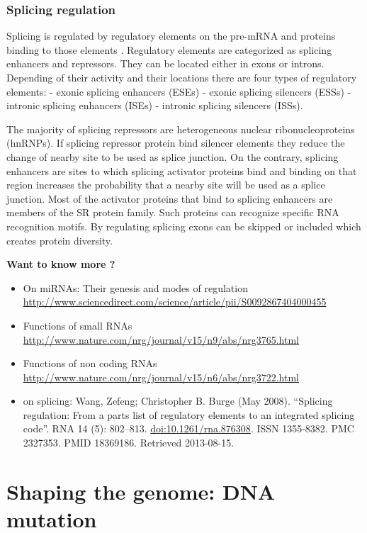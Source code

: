 \documentclass[12pt,]{krantz}
\theoremstyle{definition}
\theoremstyle{definition}
\theoremstyle{definition}
\theoremstyle{remark}
\let\BeginKnitrBlock\begin \let\EndKnitrBlock\end
\begin{document}
\hypertarget{splicing-regulation}{%
\subsubsection{Splicing regulation}\label{splicing-regulation}}

Splicing is regulated by regulatory elements on the pre-mRNA and
proteins binding to those elements . Regulatory elements are categorized
as splicing enhancers and repressors. They can be located either in
exons or introns. Depending of their activity and their locations there
are four types of regulatory elements: - exonic splicing enhancers
(ESEs) - exonic splicing silencers (ESSs) - intronic splicing enhancers
(ISEs) - intronic splicing silencers (ISSs).

The majority of splicing repressors are heterogeneous nuclear
ribonucleoproteins (hnRNPs). If splicing repressor protein bind silencer
elements they reduce the change of nearby site to be used as splice
junction. On the contrary, splicing enhancers are sites to which
splicing activator proteins bind and binding on that region increases
the probability that a nearby site will be used as a splice junction.
Most of the activator proteins that bind to splicing enhancers are
members of the SR protein family. Such proteins can recognize specific
RNA recognition motifs. By regulating splicing exons can be skipped or
included which creates protein diversity.

\BeginKnitrBlock{rmdtip}
\textbf{Want to know more ?}

\begin{itemize}
\item
  On miRNAs: Their genesis and modes of regulation
  \url{http://www.sciencedirect.com/science/article/pii/S0092867404000455}
\item
  Functions of small RNAs
  \url{http://www.nature.com/nrg/journal/v15/n9/abs/nrg3765.html}
\item
  Functions of non coding RNAs
  \url{http://www.nature.com/nrg/journal/v15/n6/abs/nrg3722.html}
\item
  on splicing: Wang, Zefeng; Christopher B. Burge (May 2008). ``Splicing
  regulation: From a parts list of regulatory elements to an integrated
  splicing code''. RNA 14 (5): 802--813. \url{doi:10.1261/rna.876308}.
  ISSN 1355-8382. PMC 2327353. PMID 18369186. Retrieved 2013-08-15.
\end{itemize}
\EndKnitrBlock{rmdtip}

\hypertarget{shaping-the-genome-dna-mutation}{%
\section{Shaping the genome: DNA
mutation}\label{shaping-the-genome-dna-mutation}}
\end{document}
